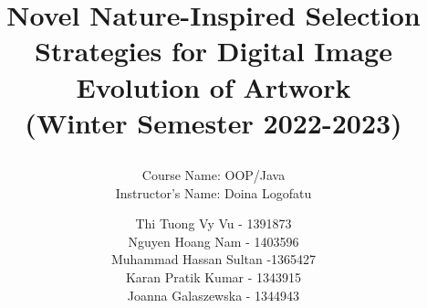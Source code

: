 \documentclass[graybox,envcountchap,sectrefs]{svmono}
\begin{document}
\author{Thi Tuong Vy Vu - 1391873\\
Nguyen Hoang Nam - 1403596\\
Muhammad Hassan Sultan -1365427\\
Karan Pratik Kumar - 1343915\\
Joanna Galaszewska - 1344943\\
}
\title{Novel Nature-Inspired Selection Strategies for Digital Image
Evolution of Artwork\\
\small(Winter Semester 2022-2023)

}
\subtitle{Course Name: OOP/Java \\
Instructor’s Name: Doina Logofatu\\}

\maketitle


\frontmatter%



\tableofcontents




\mainmatter%



\backmatter%


\end{document}
